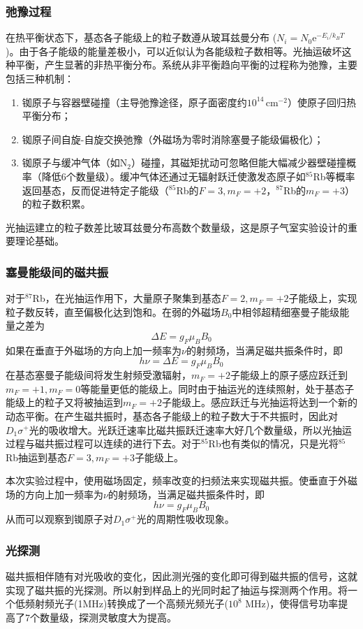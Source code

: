 \subsubsection{弛豫过程}
在热平衡状态下，基态各子能级上的粒子数遵从玻耳兹曼分布 ($N_i = N_0 \mathrm{e}^{-E_i/k_B T}$)。由于各子能级的能量差极小，可以近似认为各能级粒子数相等。光抽运破坏这种平衡，产生显著的非热平衡分布。系统从非平衡趋向平衡的过程称为弛豫，主要包括三种机制：
\begin{enumerate}
    \item 铷原子与容器壁碰撞（主导弛豫途径，原子面密度约$10^{14}\,\text{cm}^{-2}$）使原子回归热平衡分布；
    \item 铷原子间自旋-自旋交换弛豫（外磁场为零时消除塞曼子能级偏极化）；
    \item 铷原子与缓冲气体（如$\mathrm{N}_2$）碰撞，其磁矩扰动可忽略但能大幅减少器壁碰撞概率（降低6个数量级）。缓冲气体还通过无辐射跃迁使激发态原子如$^{85}$Rb等概率返回基态，反而促进特定子能级（$^{85}$Rb的$F=3, m_F=+2$，$^{87}$Rb的$m_F=+3$）的粒子数积累。
\end{enumerate}
光抽运建立的粒子数差比玻耳兹曼分布高数个数量级，这是原子气室实验设计的重要理论基础。

\subsubsection{塞曼能级间的磁共振}
对于$^{87}$Rb，在光抽运作用下，大量原子聚集到基态$F=2, m_F=+2$子能级上，实现粒子数反转，直至偏极化达到饱和。在弱的外磁场$B_0$中相邻超精细塞曼子能级能量之差为
$$
\Delta E = g_F \mu_B B_0
$$
如果在垂直于外磁场的方向上加一频率为$\nu$的射频场，当满足磁共振条件时，即
$$
h\nu = \Delta E = g_F \mu_B B_0
$$
在基态塞曼子能级间将发生射频受激辐射，$m_F = +2$子能级上的原子感应跃迁到$ m_F = +1, m_F = 0$等能量更低的能级上。同时由于抽运光的连续照射，处于基态子能级上的粒子又将被抽运到$m_F = +2$子能级上。感应跃迁与光抽运将达到一个新的动态平衡。在产生磁共振时，基态各子能级上的粒子数大于不共振时，因此对$D_1\sigma^+$光的吸收增大。光跃迁速率比磁共振跃迁速率大好几个数量级，所以光抽运过程与磁共振过程可以连续的进行下去。对于$^{85}$Rb也有类似的情况，只是光将$^{85}$Rb抽运到基态$F=3, m_F=+3$子能级上。

本次实验过程中，使用磁场固定，频率改变的扫频法来实现磁共振。使垂直于外磁场的方向上加一频率为$\nu$的射频场，当满足磁共振条件时，即
$$
h\nu = g_F \mu_B B_0
$$
从而可以观察到铷原子对$D_1\sigma^+$光的周期性吸收现象。

\subsubsection{光探测}
磁共振相伴随有对光吸收的变化，因此测光强的变化即可得到磁共振的信号，这就实现了磁共振的光探测。所以射到样品上的光同时起了抽运与探测两个作用。将一个低频射频光子(1MHz)转换成了一个高频光频光子($10^8$ MHz)，使得信号功率提高了7个数量级，探测灵敏度大为提高。


